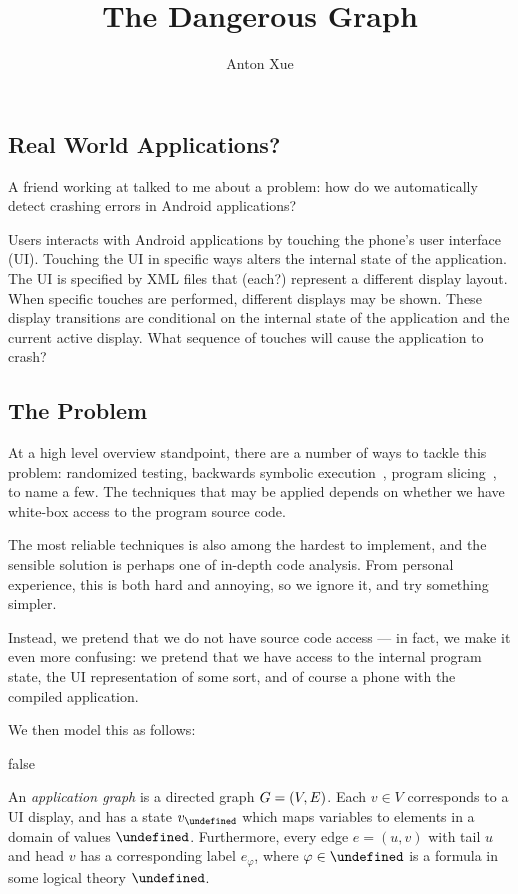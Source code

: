 \documentclass[12pt]{article}
\title{The Dangerous Graph}
\author{Anton Xue}
\date{}
\let\company\undefined
\newcommand{\company}{\textbf{Big Tech Company}}
\newcommand{\android}{Android}
\let\state\undefined
\newcommand{\state}{\ensuremath{\sigma}}
\let\domval\undefined
\newcommand{\domval}{\ensuremath{\mathcal{A}}}
\newcommand{\form}{\ensuremath{\varphi}}
\let\domform\undefined
\newcommand{\domform}{\ensuremath{\mathcal{F}}}
\begin{document}
\maketitle

\subsection{Real World Applications?}

A friend working at \company{} talked to me about a problem:
how do we automatically detect crashing errors in \android{} applications?

Users interacts with \android{} applications by touching
the phone's user interface (UI).
Touching the UI in specific ways alters the internal state of the application.
The UI is specified by XML files that (each?) represent a
different display layout.
When specific touches are performed, different displays may be shown.
These display transitions are conditional on the internal state of the
application and the current active display.
What sequence of touches will cause the application to crash?

\subsection{The Problem}
At a high level overview standpoint, there are a number of ways to tackle
this problem: randomized testing,
backwards symbolic execution~\cite{baldoni-backwards},
program slicing~\cite{weiser-slicing}, to name a few.
The techniques that may be applied depends on whether we have
white-box access to the program source code.

The most reliable techniques is also among the hardest to implement, and the
sensible solution is perhaps one of in-depth code analysis.
From personal experience, this is both hard and annoying, so we ignore it,
and try something simpler.

Instead, we pretend that we do not have source code access --- in fact,
we make it even more confusing:
we pretend that we have access to the internal program state, the UI
representation of some sort, and of course a phone with the compiled
application.

We then model this as follows:

\if false
\begin{definition}
An \textit{application graph} is a directed graph $G = {\left(V, E\right)}$.
Each $v \in V$ corresponds to a UI display, and has a state
$v_\state$ which maps variables to elements in a domain of values $\domval$.
Furthermore, every edge $e = (u, v)$ with tail $u$ and head $v$ has
a corresponding label $e_{\form}$, where $\form \in \domform$ is a
formula in some logical theory $\domform$.
\end{definition}
\fi
\end{document}
